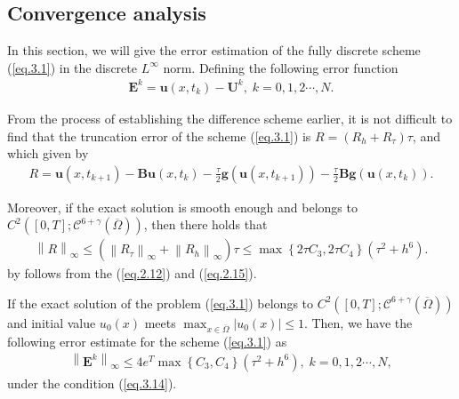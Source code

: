 \documentclass{siamart171218}
\numberwithin{theorem}{section}
\numberwithin{equation}{section}
\begin{document}
\subsection{Convergence analysis}
In this section, we will give the error estimation of the fully discrete scheme (\ref{eq.3.1})
in the discrete $L^\infty$ norm. Defining the following error function
\begin{equation*}
\begin{aligned}\displaystyle
{\mathbf{E}}^{k}=\mathbf{u}(x,t_k)-
\mathbf{U}^k,\;k=0,1,2\cdots,N.
\end{aligned}
\end{equation*}

From the process of establishing the difference scheme earlier, it is not difficult to find that
the truncation error of the scheme (\ref{eq.3.1}) is $R=\left(R_h+R_{\tau}\right)\tau$,
and which given by
\begin{equation*}
\begin{aligned}\displaystyle
R=\mathbf{u}\left(x,t_{k+1}\right)-\mathbf{B}\mathbf{u}\left(x,t_{k}\right)
-\frac{\tau}{2}\mathbf{g}\left(\mathbf{u}\left(x,t_{k+1}\right)\right)-
\frac{\tau}{2}\mathbf{B}
\mathbf{g}\left(\mathbf{u}\left(x,t_{k}\right)\right).
\end{aligned}
\end{equation*}

Moreover, if the exact solution is smooth enough and belongs to
$C^2\left([0,T];\mathscr{C}^{6+\gamma}\left(\overline{\Omega}\right)\right)$,
then there holds that
\begin{equation*}
\begin{aligned}\displaystyle
\left\|R\right\|_\infty\leq\left(\left\|R_\tau\right\|_\infty+\left\|R_h\right\|_\infty\right)\tau
\leq\max\left\{2\tau C_3, 2\tau C_4\right\}\left(\tau^2+h^6\right).
\end{aligned}
\end{equation*}
by follows from the (\ref{eq.2.12}) and (\ref{eq.2.15}).

\begin{theorem}\label{Th.3.14}
If the exact solution of the problem (\ref{eq.3.1}) belongs to
$C^2\left([0,T];\mathscr{C}^{6+\gamma}\left(\overline{\Omega}\right)\right)$
and initial value $u_0(x)$ meets
  $\max_{{x}\in\overline{\Omega}}\left|u_0({x})\right| \leq1$.
  Then, we have the following error estimate for the
  scheme (\ref{eq.3.1}) as
\begin{equation*}
\begin{aligned}\displaystyle
\left\|{\mathbf{E}}^{k}\right\|_\infty\leq4e^T\max\left\{C_3,C_4\right\}
\left(\tau^2+h^6\right),\;k=0,1,2\cdots,N,
\end{aligned}
\end{equation*}
under the condition (\ref{eq.3.14}).
\end{theorem}
\end{document}
